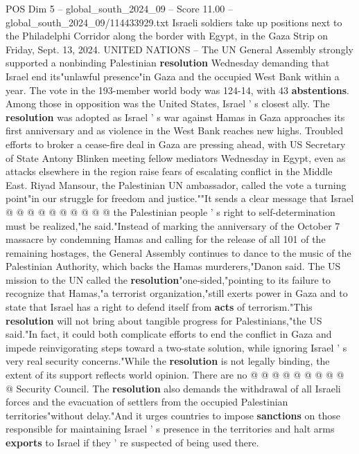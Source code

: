 \begin{textsample}{POS Dim 5 – global\_south\_2024\_09 – Score 11.00 – global\_south\_2024\_09/114433929.txt}  \label{ex:f5_pos_240}
Israeli soldiers take up positions next to the Philadelphi Corridor along the border with Egypt, in the Gaza Strip on Friday, Sept. 13, 2024.
UNITED NATIONS -- The UN General Assembly strongly supported a nonbinding Palestinian \textbf{resolution} Wednesday demanding that Israel end its"unlawful presence"in Gaza and the occupied West Bank within a year.
The vote in the 193-member world body was 124-14, with 43 \textbf{abstentions}.
Among those in opposition was the United States, Israel ' s closest ally.
The \textbf{resolution} was adopted as Israel ' s war against Hamas in Gaza approaches its first anniversary and as violence in the West Bank reaches new highs.
Troubled efforts to broker a cease-fire deal in Gaza are pressing ahead, with US Secretary of State Antony Blinken meeting fellow mediators Wednesday in Egypt, even as attacks elsewhere in the region raise fears of escalating conflict in the Middle East.
Riyad Mansour, the Palestinian UN ambassador, called the vote a turning point"in our struggle for freedom and justice.""It sends a clear message that Israel @ @ @ @ @ @ @ @ @ @ the Palestinian people ' s right to self-determination must be realized,"he said."Instead of marking the anniversary of the October 7 massacre by condemning Hamas and calling for the release of all 101 of the remaining hostages, the General Assembly continues to dance to the music of the Palestinian Authority, which backs the Hamas murderers,"Danon said.
The US mission to the UN called the \textbf{resolution}"one-sided,"pointing to its failure to recognize that Hamas,"a terrorist organization,"still exerts power in Gaza and to state that Israel has a right to defend itself from \textbf{acts} of terrorism."This \textbf{resolution} will not bring about tangible progress for Palestinians,"the US said."In fact, it could both complicate efforts to end the conflict in Gaza and impede reinvigorating steps toward a two-state solution, while ignoring Israel ' s very real security concerns."While the \textbf{resolution} is not legally binding, the extent of its support reflects world opinion.
There are no @ @ @ @ @ @ @ @ @ @ Security Council.
The \textbf{resolution} also demands the withdrawal of all Israeli forces and the evacuation of settlers from the occupied Palestinian territories"without delay."And it urges countries to impose \textbf{sanctions} on those responsible for maintaining Israel ' s presence in the territories and halt arms \textbf{exports} to Israel if they ' re suspected of being used there.

\end{textsample}
